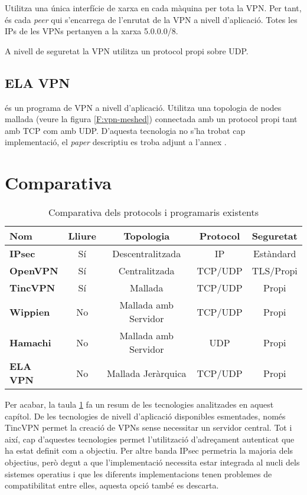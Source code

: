Utilitza una única interfície de xarxa en cada màquina per tota la VPN. Per tant, és cada \emph{peer} qui s'encarrega de l'enrutat de la VPN a nivell d'aplicació. Totes les IPs de les VPNs pertanyen a la xarxa 5.0.0.0/8.

A nivell de seguretat la VPN utilitza un protocol propi sobre UDP.

\subsection{ELA VPN}
 és un programa de VPN a nivell d'aplicació.
Utilitza una topologia de nodes mallada (veure la figura \ref{F:vpn-meshed}) connectada amb un protocol propi tant amb TCP com amb UDP.
D'aquesta tecnologia no s'ha trobat cap implementació, el \emph{paper} descriptiu es troba adjunt a l'annex .

\section{Comparativa}
\begin{table}[htb]
\begin{center}
\begin{tabular}{|l|c|c|c|c|}
\hline
Nom & Lliure & Topologia & Protocol & Seguretat \\ \hline \hline
\bf IPsec & Sí & Descentralitzada & IP & Estàndard \\ \hline
\bf OpenVPN & Sí & Centralitzada & TCP/UDP & TLS/Propi \\ \hline
\bf TincVPN & Sí & Mallada & TCP/UDP & Propi \\ \hline
\bf Wippien & No & Mallada amb Servidor & TCP/UDP & Propi \\ \hline
\bf Hamachi & No & Mallada amb Servidor & UDP & Propi \\ \hline
\bf ELA VPN & No & Mallada Jeràrquica & TCP/UDP & Propi \\ \hline
\end{tabular}
\end{center}
\begin{center}
\caption{Comparativa dels protocols i programaris existents}
\label{T:statecomp}
\end{center}
\end{table}
Per acabar, la taula \ref{T:statecomp} fa un resum de les tecnologies analitzades en aquest capítol. De les tecnologies de nivell d'aplicació disponibles esmentades, només TincVPN permet la creació de VPNs sense necessitar un servidor central. Tot i així, cap d'aquestes tecnologies permet l'utilització d'adreçament autenticat que ha estat definit com a objectiu. Per altre banda IPsec permetria la majoria dels objectius, però degut a que l'implementació necessita estar integrada al nucli dels sistemes operatius i que les diferents implementacions tenen problemes de compatibilitat entre elles, aquesta opció també es descarta.
